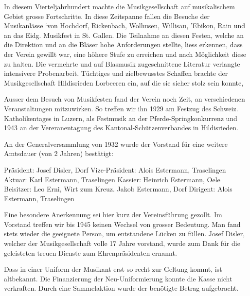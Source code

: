 \begin{history}


    In diesem Vierteljahrhundert machte die Musikgesellschaft auf musikalischem
    Gebiet grosse Fortschritte. In diese Zeitspanne fallen die Besuche der
    Musikanlässe ‘von Hochdorf, Rickenbach, Wolhusen, Willisau, 'Ebikon, Rain
    und an das Eidg. Musikfest in St. Gallen. Die Teilnahme an diesen Festen,
    welche an die Direktion und an die Bläser hohe Anforderungen stellte, liess
    erkennen, dass der Verein gewillt war, eine höhere Stufe zu erreichen und
    nach Möglichkeit diese zu halten. Die vermehrte und auf Blasmusik
    zugeschnittene Literatur verlangte intensivere Probenarbeit. Tüchtiges und
    zielbewusstes Schaffen brachte der Musikgesellschaft Hildisrieden Lorbeeren
    ein, auf die sie sicher stolz sein konnte,

    Ausser dem Besuch von Musikfesten fand der Verein noch Zeit, an
    verschiedenen Veranstaltungen mitzuwirken. So treffen wir ihn 1929 am
    Festzug des Schweiz. Katholikentages in Luzern, als Festmusik an der
    Pferde-Springkonkurrenz und 1943 an der Vereranentagung des
    Kantonal-Schützenverbandes in Hildisrieden.

    An der Generalversammlung von 1932 wurde der Vorstand für eine weitere
    Amtsdauer (von 2 Jahren) bestätigt:

    Präsident: Josef Disler, Dorf Vize-Präsident: Alois Estermann, Traselingen
    Aktuar: Karl Estermann, Traselingen Kassier: Heinrich Estermann, Oele
    Beisitzer: Leo Erni, Wirt zum Kreuz. Jakob Estermann, Dorf Dirigent: Alois
    Estermann, Traselingen


    Eine besondere Anerkennung sei hier kurz der Vereinsführung gezollt. Im
    Vorstand treffen wir bis 1945 keinen Wechsel von grosser Bedeutung. Man fand
    stets wieder die geeignete Person, um entstandene Lücken zu füllen. Josef
    Disler, welcher der Musikgesellschaft volle 17 Jahre vorstand, wurde zum
    Dank für die geleisteten treuen Dienste zum Ehrenpräsidenten ernannt.

    Dass in einer Uniform der Musikant erst so recht zur Geltung kommt, ist
    altbekannt. Die Finanzierung der Neu-Uniformierung konnte die Kasse nicht
    verkraften. Durch eine Sammelaktion wurde der benötigte Betrag aufgebracht.


\end{history}
